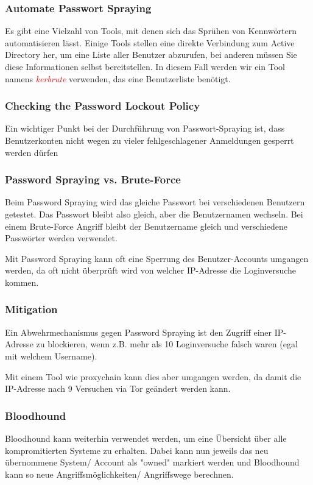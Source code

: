 \subsubsection{Automate Passwort Spraying}
Es gibt eine Vielzahl von Tools, mit denen sich das Sprühen von Kennwörtern automatisieren lässt. Einige Tools stellen eine direkte Verbindung zum Active Directory her, um eine Liste aller Benutzer abzurufen, bei anderen müssen Sie diese Informationen selbst bereitstellen.
In diesem Fall werden wir ein Tool namens \textcolor{red}{\textit{kerbrute}} verwenden, das eine Benutzerliste benötigt.

\subsubsection{Checking the Password Lockout Policy}
Ein wichtiger Punkt bei der Durchführung von Passwort-Spraying ist, dass Benutzerkonten nicht wegen zu vieler fehlgeschlagener Anmeldungen gesperrt werden dürfen

\subsubsection{Password Spraying vs. Brute-Force}
Beim Password Spraying wird das gleiche Passwort bei verschiedenen Benutzern getestet. Das Passwort bleibt also gleich, aber die Benutzernamen wechseln.
Bei einem Brute-Force Angriff bleibt der Benutzername gleich und verschiedene Passwörter werden verwendet.

Mit Password Spraying kann oft eine Sperrung des Benutzer-Accounts umgangen werden, da oft nicht überprüft wird von welcher IP-Adresse die Loginversuche kommen.

\subsubsection{Mitigation}
Ein Abwehrmechanismus gegen Password Spraying ist den Zugriff einer IP-Adresse zu blockieren, wenn z.B. mehr als 10 Loginversuche falsch waren (egal mit welchem Username).

Mit einem Tool wie proxychain kann dies aber umgangen werden, da damit die IP-Adresse nach 9 Versuchen via Tor geändert werden kann.

\subsubsection{Bloodhound}
Bloodhound kann weiterhin verwendet werden, um eine Übersicht über alle kompromitierten Systeme zu erhalten. Dabei kann nun jeweils das neu übernommene System/ Account als "owned" markiert werden und Bloodhound kann so neue Angriffsmöglichkeiten/ Angriffswege berechnen.




